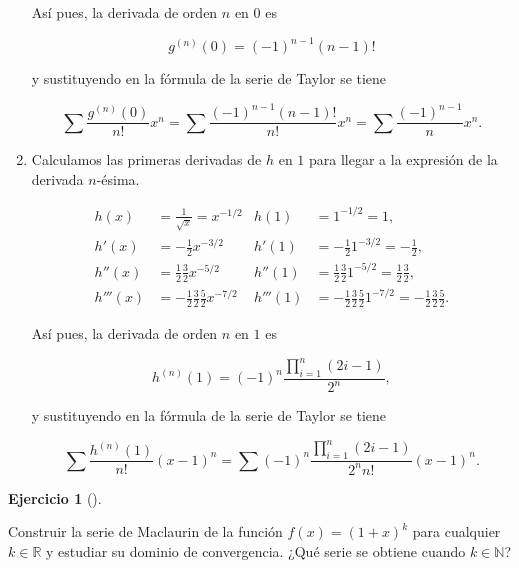 \documentclass[
  a4paper,
]{scrreport}
\theoremstyle{definition}
\newtheorem{exercise}{Ejercicio}[chapter]
\theoremstyle{remark}
\begin{document}
\begin{tcolorbox}
\begin{enumerate}
  Así pues, la derivada de orden \(n\) en \(0\) es

  \[
   g^{(n)}(0) = (-1)^{n-1}(n-1)!
   \]

  y sustituyendo en la fórmula de la serie de Taylor se tiene

  \[
   \sum \frac{g^{(n)}(0)}{n!}x^n = \sum \frac{(-1)^{n-1}(n-1)!}{n!}x^n = \sum \frac{(-1)^{n-1}}{n}x^n.
   \]
\item
  Calculamos las primeras derivadas de \(h\) en \(1\) para llegar a la
  expresión de la derivada \(n\)-ésima.

  \begin{align*}
   h(x) &= \frac{1}{\sqrt{x}} = x^{-1/2} & h(1) &= 1^{-1/2} = 1,\\
   h'(x) &= -\frac{1}{2}x^{-3/2} & h'(1) &= -\frac{1}{2}1^{-3/2} = -\frac{1}{2},\\
   h''(x) &= \frac{1}{2}\frac{3}{2}x^{-5/2} & h''(1) &= \frac{1}{2}\frac{3}{2}1^{-5/2} = \frac{1}{2}\frac{3}{2},\\
   h'''(x) &= -\frac{1}{2}\frac{3}{2}\frac{5}{2}x^{-7/2} & h'''(1) &= -\frac{1}{2}\frac{3}{2}\frac{5}{2}1^{-7/2} = -\frac{1}{2}\frac{3}{2}\frac{5}{2}.
   \end{align*}

  Así pues, la derivada de orden \(n\) en \(1\) es

  \[
   h^{(n)}(1) = (-1)^n\frac{\prod_{i=1}^n(2i-1)}{2^n},
   \]

  y sustituyendo en la fórmula de la serie de Taylor se tiene

  \[
   \sum \frac{h^{(n)}(1)}{n!}(x-1)^n = \sum (-1)^n\frac{\prod_{i=1}^n(2i-1)}{2^nn!}(x-1)^n.
   \]
\end{enumerate}

\end{tcolorbox}

\begin{exercise}[]\protect\hypertarget{exr-serie-binomial}{}\label{exr-serie-binomial}

Construir la serie de Maclaurin de la función \(f(x)= (1+x)^k\) para
cualquier \(k\in\mathbb{R}\) y estudiar su dominio de convergencia. ¿Qué
serie se obtiene cuando \(k\in\mathbb{N}\)?

\end{exercise}
\end{document}
